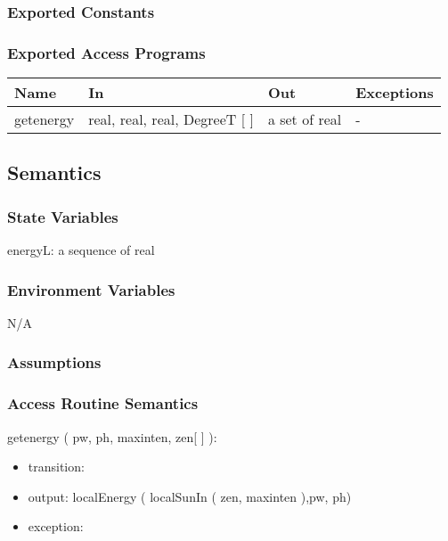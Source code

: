 \documentclass[12pt, titlepage]{article}
\begin{document}
\subsubsection{Exported Constants}


\subsubsection{Exported Access Programs}

\begin{center}
\begin{tabular}{p{2cm} p{5cm} p{4cm} p{1cm}}
\hline
\textbf{Name} & \textbf{In} & \textbf{Out} & \textbf{Exceptions} \\
\hline 
getenergy & real, real, real, DegreeT [ ] & a set of real & - \\


\hline
\end{tabular}
\end{center}


\subsection{Semantics}

\subsubsection{State Variables}

energyL: a sequence of real\\

\subsubsection{Environment Variables}

N/A

\subsubsection{Assumptions}



\subsubsection{ Access Routine Semantics}

\noindent  getenergy ( pw, ph, maxinten, zen[ ] ):
\begin{itemize}
\item transition:
\item output:  localEnergy ( localSunIn ( zen, maxinten ),pw, ph)
\item exception: 
\end{itemize}
\end{document}
